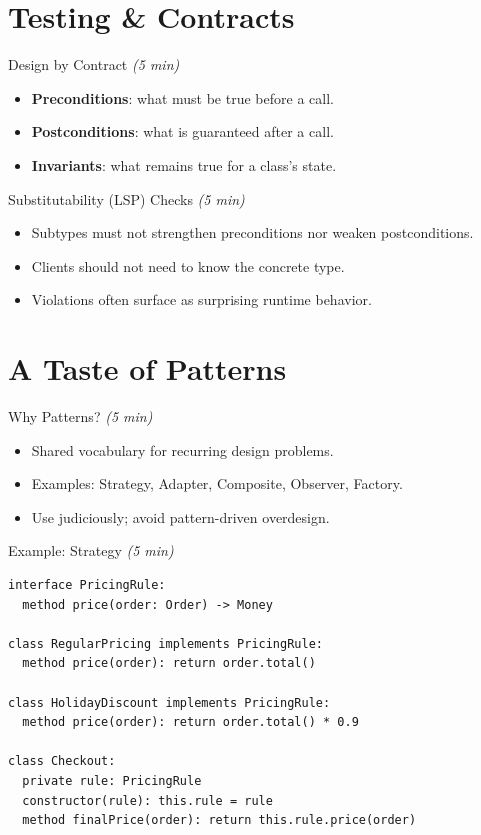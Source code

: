 \documentclass[aspectratio=169,11pt]{beamer}
\newcommand{\term}[1]{\textbf{#1}}
\newcommand{\mins}[1]{\textit{(#1 min)}}
\begin{document}
\section{Testing \& Contracts}

\begin{frame}{Design by Contract \mins{5}}
  \begin{itemize}
    \item \term{Preconditions}: what must be true before a call.
    \item \term{Postconditions}: what is guaranteed after a call.
    \item \term{Invariants}: what remains true for a class’s state.
  \end{itemize}
\end{frame}

\begin{frame}{Substitutability (LSP) Checks \mins{5}}
  \begin{itemize}
    \item Subtypes must not strengthen preconditions nor weaken postconditions.
    \item Clients should not need to know the concrete type.
    \item Violations often surface as surprising runtime behavior.
  \end{itemize}
\end{frame}

\section{A Taste of Patterns}

\begin{frame}{Why Patterns? \mins{5}}
  \begin{itemize}
    \item Shared vocabulary for recurring design problems.
    \item Examples: Strategy, Adapter, Composite, Observer, Factory.
    \item Use judiciously; avoid pattern-driven overdesign.
  \end{itemize}
\end{frame}

\begin{frame}[fragile]{Example: Strategy \mins{5}}
\begin{lstlisting}
interface PricingRule:
  method price(order: Order) -> Money

class RegularPricing implements PricingRule:
  method price(order): return order.total()

class HolidayDiscount implements PricingRule:
  method price(order): return order.total() * 0.9

class Checkout:
  private rule: PricingRule
  constructor(rule): this.rule = rule
  method finalPrice(order): return this.rule.price(order)
\end{lstlisting}
\end{frame}
\end{document}
